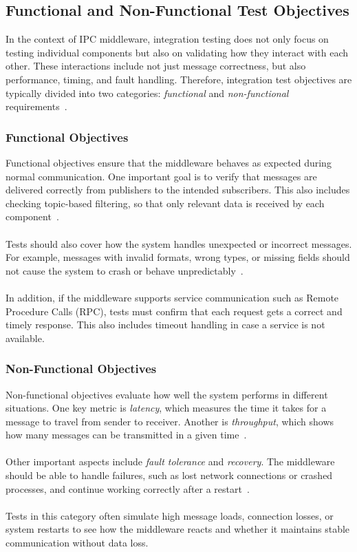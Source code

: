 \newpage
\subsection{Functional and Non-Functional Test Objectives}

In the context of IPC middleware, integration testing does not only focus on testing individual components but also on validating how they interact with each other. These interactions include not just message correctness, but also performance, timing, and fault handling. Therefore, integration test objectives are typically divided into two categories: \textit{functional} and \textit{non-functional} requirements~\cite{gorton2006software, tanenbaum2017}.

\subsubsection{Functional Objectives}

Functional objectives ensure that the middleware behaves as expected during normal communication. One important goal is to verify that messages are delivered correctly from publishers to the intended subscribers. This also includes checking topic-based filtering, so that only relevant data is received by each component~\cite{josuttis2007}.
\\
\\
Tests should also cover how the system handles unexpected or incorrect messages. For example, messages with invalid formats, wrong types, or missing fields should not cause the system to crash or behave unpredictably~\cite{burnstein2003practical}.
\\
\\
In addition, if the middleware supports service communication such as Remote Procedure Calls (RPC), tests must confirm that each request gets a correct and timely response. This also includes timeout handling in case a service is not available.

\subsubsection{Non-Functional Objectives}

Non-functional objectives evaluate how well the system performs in different situations. One key metric is \textit{latency}, which measures the time it takes for a message to travel from sender to receiver. Another is \textit{throughput}, which shows how many messages can be transmitted in a given time~\cite{stallings2018}.
\\
\\
Other important aspects include \textit{fault tolerance} and \textit{recovery}. The middleware should be able to handle failures, such as lost network connections or crashed processes, and continue working correctly after a restart~\cite{burns2009real}.
\\
\\
Tests in this category often simulate high message loads, connection losses, or system restarts to see how the middleware reacts and whether it maintains stable communication without data loss.

